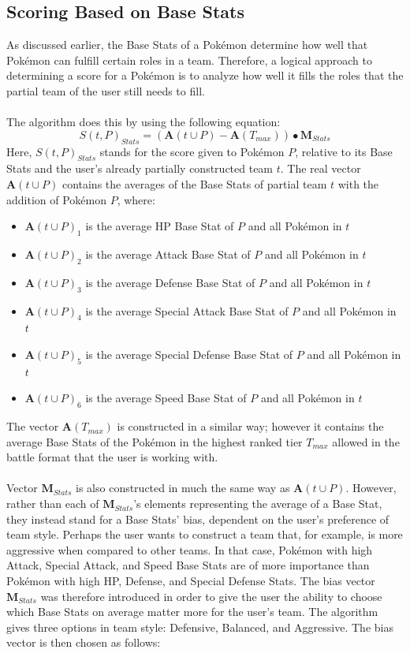 \documentclass{article}
\begin{document}
\subsection{Scoring Based on Base Stats}\label{scoringBaseStats}
As discussed earlier, the Base Stats of a Pok\'emon determine how well that Pok\'emon can fulfill certain roles in a team. Therefore, a logical approach to determining a score for a Pok\'emon is to analyze how well it fills the roles that the partial team of the user still needs to fill.\\\\
The algorithm does this by using the following equation:
\begin{equation}\label{statsScoreEqn}
	S(t,P)_{Stats}=(\textbf{A}(t\cup P)-\textbf{A}(T_{max}))\bullet\textbf{M}_{Stats}
\end{equation}
Here, $S(t,P)_{Stats}$ stands for the score given to Pok\'emon $P$, relative to its Base Stats and the user's already partially constructed team $t$. The real vector $\textbf{A}(t\cup P)$ contains the averages of the Base Stats of partial team $t$ with the addition of Pok\'emon $P$, where:
\begin{itemize}
	\item $\textbf{A}(t\cup P)_1$ is the average HP Base Stat of $P$ and all Pok\'emon in $t$
	\item $\textbf{A}(t\cup P)_2$ is the average Attack Base Stat of $P$ and all Pok\'emon in $t$
	\item $\textbf{A}(t\cup P)_3$ is the average Defense Base Stat of $P$ and all Pok\'emon in $t$
	\item $\textbf{A}(t\cup P)_4$ is the average Special Attack Base Stat of $P$ and all Pok\'emon in $t$
	\item $\textbf{A}(t\cup P)_5$ is the average Special Defense Base Stat of $P$ and all Pok\'emon in $t$
	\item $\textbf{A}(t\cup P)_6$ is the average Speed Base Stat of $P$ and all Pok\'emon in $t$
\end{itemize}
The vector $\textbf{A}(T_{max})$ is constructed in a similar way; however it contains the average Base Stats of the Pok\'emon in the highest ranked tier $T_{max}$ allowed in the battle format that the user is working with.\\\\
Vector $\textbf{M}_{Stats}$ is also constructed in much the same way as $\textbf{A}(t\cup P)$. However, rather than each of $\textbf{M}_{Stats}$'s elements representing the average of a Base Stat, they instead stand for a Base Stats' bias, dependent on the user's preference of team style. Perhaps the user wants to construct a team that, for example, is more aggressive when compared to other teams. In that case, Pok\'emon with high Attack, Special Attack, and Speed Base Stats are of more importance than Pok\'emon with high HP, Defense, and Special Defense Stats. The bias vector $\textbf{M}_{Stats}$ was therefore introduced in order to give the user the ability to choose which Base Stats on average matter more for the user's team. The algorithm gives three options in team style: Defensive, Balanced, and Aggressive. The bias vector is then chosen as follows:
\end{document}
